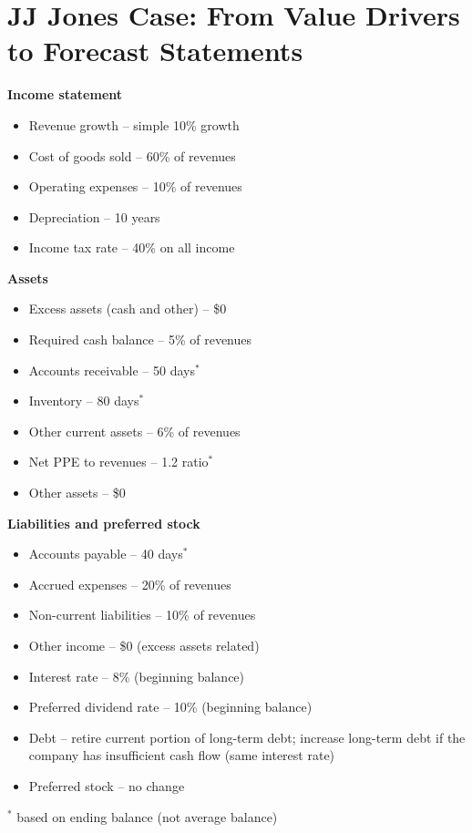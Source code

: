\section{JJ Jones Case: From Value Drivers to Forecast Statements}\label{sec:jjjones}

\begin{exbox}
\small
\begin{minipage}[t]{0.48\linewidth}
\textbf{\color{keyred}Income statement}
\begin{itemize}[leftmargin=*]
  \item Revenue growth -- simple 10\% growth
  \item Cost of goods sold -- 60\% of revenues
  \item Operating expenses -- 10\% of revenues
  \item Depreciation -- 10 years
  \item Income tax rate -- 40\% on all income
\end{itemize}
\textbf{\color{keyred}Assets}
\begin{itemize}[leftmargin=*]
  \item Excess assets (cash and other) -- \$0
  \item Required cash balance -- 5\% of revenues
  \item Accounts receivable -- 50 days$^*$
  \item Inventory -- 80 days$^*$
  \item Other current assets -- 6\% of revenues
  \item Net PPE to revenues -- 1.2 ratio$^*$
  \item Other assets -- \$0
\end{itemize}
\end{minipage}\hfill
\begin{minipage}[t]{0.48\linewidth}
\textbf{\color{keyred}Liabilities and preferred stock}
\begin{itemize}[leftmargin=*]
  \item Accounts payable -- 40 days$^*$
  \item Accrued expenses -- 20\% of revenues
  \item Non-current liabilities -- 10\% of revenues
  \item Other income -- \$0 (excess assets related)
  \item Interest rate -- 8\% (beginning balance)
  \item Preferred dividend rate -- 10\% (beginning balance)
  \item Debt -- retire current portion of long-term debt; increase long-term debt if the company has insufficient cash flow (same interest rate)
  \item Preferred stock -- no change
\end{itemize}
\end{minipage}

\smallskip
\footnotesize $^*$ based on ending balance (not average balance)
\end{exbox}


